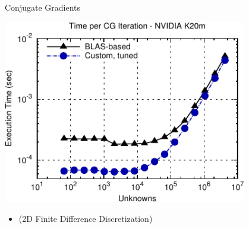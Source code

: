 \begin{frame}[fragile]{Conjugate Gradients}
 \begin{block}{}
 \begin{center}
  \vspace*{-0.5cm}
  \includegraphics[width=0.8\textwidth]{figures/cg-k20m-3-crop}
 \end{center}

 \begin{itemize}
  \item   \vspace*{-0.3cm} {\small (2D Finite Difference Discretization)}
 \end{itemize}
 \end{block}   
\end{frame}






